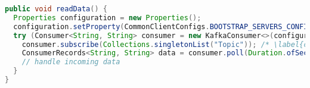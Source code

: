 
\begin{lstlisting}[language=Java, caption={Example of reading data using Kafka Consumer}, label={code:kafka:consumer}]
public void readData() {
  Properties configuration = new Properties();
  configuration.setProperty(CommonClientConfigs.BOOTSTRAP_SERVERS_CONFIG, "localhost:9092"); /* \label{code:kafka:consumer:properties} */
  try (Consumer<String, String> consumer = new KafkaConsumer<>(configuration)) {
    consumer.subscribe(Collections.singletonList("Topic")); /* \label{code:kafka:consumer:subscribe} */
    ConsumerRecords<String, String> data = consumer.poll(Duration.ofSeconds(1)); /* \label{code:kafka:consumer:poll} */
    // handle incoming data
  }
}
\end{lstlisting}
